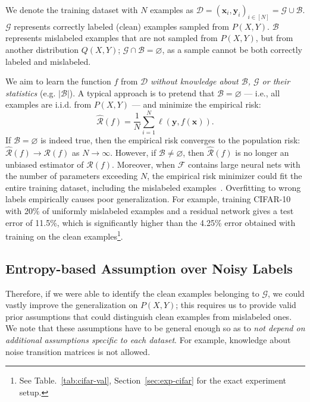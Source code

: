 \documentclass[a4paper,11pt]{article}
\newcommand{\mc}[1]{\mathcal{#1}}
\newcommand{\train}{\mathcal{D}}
\def\rvx{{\mathbf{x}}}
\def\rvy{{\mathbf{y}}}
\begin{document}
We denote the training dataset with $N$ examples as $\train = (\rvx_i, \rvy_i)_{i \in [N]} = \mc{G} \cup \mc{B}$. $\mc{G}$ represents correctly labeled (clean) examples sampled from $P(X, Y)$. $\mc{B}$ represents mislabeled examples that are not sampled from $P(X, Y)$, but from another distribution $Q(X, Y)$; $\mc{G} \cap \mc{B} = \varnothing$, as a sample cannot be both correctly labeled and mislabeled. 


We aim to learn the function $f$ from $\train$ \emph{without knowledge about $\mc{B}$, $\mc{G}$ or their statistics} (e.g. $|\mc{B}|$). 
A typical approach is to pretend that $\mc{B} = \varnothing$ --- i.e., all examples are i.i.d. from $P(X, Y)$ --- and minimize the empirical risk:
$$
\hat{\mc{R}}(f) = \frac{1}{N} \sum_{i = 1}^{N} \ell(\rvy, f(\rvx)).
$$
If $\mc{B} = \varnothing$ is indeed true, then the empirical risk converges to the population risk: $\hat{\mc{R}}(f) \to \mc{R}(f)$ as $N \to \infty$. However, if $\mc{B} \neq \varnothing$, then $\hat{\mc{R}}(f)$ is no longer an unbiased estimator of $\mc{R}(f)$. 
Moreover, when $\mc{F}$ contains large neural nets with the number of parameters exceeding $N$, the empirical risk minimizer could fit the entire training dataset, including the mislabeled examples~\cite{zhang2016understanding}. Overfitting to wrong labels empirically causes poor generalization.  For example, training CIFAR-10 with 20\% of uniformly mislabeled examples and a residual network gives a test error of 11.5\%, which is significantly higher than the 4.25\% error obtained with training on the clean examples\footnote{See Table.~\ref{tab:cifar-val}, Section~\ref{sec:exp-cifar} for the exact experiment setup.}.



\subsection{Entropy-based Assumption over Noisy Labels}
Therefore, if we were able to identify the clean examples belonging to $\mc{G}$, we could vastly improve the generalization on $P(X, Y)$; this requires us to provide valid prior assumptions that could distinguish clean examples from mislabeled ones. We note that these assumptions have to be general enough so as to \textit{not depend on additional assumptions specific to each dataset}. For example, knowledge about noise transition matrices is not allowed.
\end{document}
